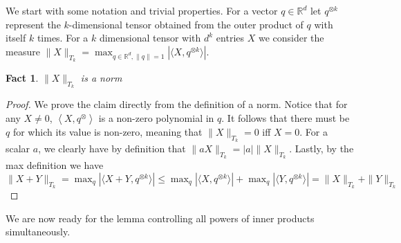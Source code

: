 \documentclass[anon,12pt]{colt2019} %
\newtheorem{fact}[theorem]{Fact}
\newcommand{\ip}[1]{\left \langle #1 \right \rangle}
\newcommand{\R}{\mathbb{R}}
\begin{document}
We start with some notation and trivial properties. 
For a vector $q \in \R^d$ let $q^{\otimes k}$ represent the $k$-dimensional tensor obtained from the outer product of $q$ with itself $k$ times. For a $k$ dimensional tensor with $d^k$ entries $X$ we consider the measure
$\|X\|_{T_k} = \max_{q \in \R^d, \|q\|=1} \left| \langle X, q^{\otimes k}\rangle \right|$.
\begin{fact}
$\|X\|_{T_k}$ is a norm
\end{fact}
\begin{proof}
We prove the claim directly from the definition of a norm.
Notice that for any $X \neq 0$, $\ip{X, q^{\otimes}}$ is a non-zero polynomial in $q$. It follows that there must be $q$ for which its value is non-zero, meaning that $\|X\|_{T_k}=0$ iff $X=0$. For a scalar $a$, we clearly have by definition that
$\|aX\|_{T_k} = |a|\|X\|_{T_k}$.  Lastly, by the max definition we  have
$ \|X+Y\|_{T_k} =  \max_q \left| \langle X+Y, q^{\otimes k}\rangle \right| \leq 
\max_q \left| \langle X, q^{\otimes k}\rangle \right| + \max_q\left| \langle Y, q^{\otimes k}\rangle \right| = \|X\|_{T_k} + \|Y\|_{T_k}$
\end{proof}

We are now ready for the lemma controlling all powers of inner products simultaneously. 
\end{document}

